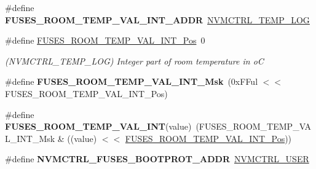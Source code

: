 \begin{DoxyCompactItemize}
\item 
\hypertarget{group__fuses__api_ga99a8874510c968fb5a619235ac738f4b}{}\#define {\bfseries F\+U\+S\+E\+S\+\_\+\+R\+O\+O\+M\+\_\+\+T\+E\+M\+P\+\_\+\+V\+A\+L\+\_\+\+I\+N\+T\+\_\+\+A\+D\+D\+R}~\hyperlink{group___s_a_m_l21_j18_a__base_gae900d443ec6d7cf1c90d21b6662fa447}{N\+V\+M\+C\+T\+R\+L\+\_\+\+T\+E\+M\+P\+\_\+\+L\+O\+G}\label{group__fuses__api_ga99a8874510c968fb5a619235ac738f4b}

\item 
\hypertarget{group__fuses__api_ga614f00b6390a26716abbcbbd6e7d7b7d}{}\#define \hyperlink{group__fuses__api_ga614f00b6390a26716abbcbbd6e7d7b7d}{F\+U\+S\+E\+S\+\_\+\+R\+O\+O\+M\+\_\+\+T\+E\+M\+P\+\_\+\+V\+A\+L\+\_\+\+I\+N\+T\+\_\+\+Pos}~0\label{group__fuses__api_ga614f00b6390a26716abbcbbd6e7d7b7d}

\begin{DoxyCompactList}\small\item\em (N\+V\+M\+C\+T\+R\+L\+\_\+\+T\+E\+M\+P\+\_\+\+L\+O\+G) Integer part of room temperature in o\+C \end{DoxyCompactList}\item 
\hypertarget{group__fuses__api_gad9cfc82c72b2f757ed5d93969b679f19}{}\#define {\bfseries F\+U\+S\+E\+S\+\_\+\+R\+O\+O\+M\+\_\+\+T\+E\+M\+P\+\_\+\+V\+A\+L\+\_\+\+I\+N\+T\+\_\+\+Msk}~(0x\+F\+Ful $<$$<$ F\+U\+S\+E\+S\+\_\+\+R\+O\+O\+M\+\_\+\+T\+E\+M\+P\+\_\+\+V\+A\+L\+\_\+\+I\+N\+T\+\_\+\+Pos)\label{group__fuses__api_gad9cfc82c72b2f757ed5d93969b679f19}

\item 
\hypertarget{group__fuses__api_gaca57712e9a2b15cb9e40facb54c0dacb}{}\#define {\bfseries F\+U\+S\+E\+S\+\_\+\+R\+O\+O\+M\+\_\+\+T\+E\+M\+P\+\_\+\+V\+A\+L\+\_\+\+I\+N\+T}(value)~(F\+U\+S\+E\+S\+\_\+\+R\+O\+O\+M\+\_\+\+T\+E\+M\+P\+\_\+\+V\+A\+L\+\_\+\+I\+N\+T\+\_\+\+Msk \& ((value) $<$$<$ \hyperlink{group__fuses__api_ga614f00b6390a26716abbcbbd6e7d7b7d}{F\+U\+S\+E\+S\+\_\+\+R\+O\+O\+M\+\_\+\+T\+E\+M\+P\+\_\+\+V\+A\+L\+\_\+\+I\+N\+T\+\_\+\+Pos}))\label{group__fuses__api_gaca57712e9a2b15cb9e40facb54c0dacb}

\item 
\hypertarget{group__fuses__api_ga9c0a81f9fd5adfc5fb23ea51357116ee}{}\#define {\bfseries N\+V\+M\+C\+T\+R\+L\+\_\+\+F\+U\+S\+E\+S\+\_\+\+B\+O\+O\+T\+P\+R\+O\+T\+\_\+\+A\+D\+D\+R}~\hyperlink{group___s_a_m_l21_j18_a__base_ga7a7a83a5753fa323b61536e396083c99}{N\+V\+M\+C\+T\+R\+L\+\_\+\+U\+S\+E\+R}\label{group__fuses__api_ga9c0a81f9fd5adfc5fb23ea51357116ee}


\end{DoxyCompactItemize}
